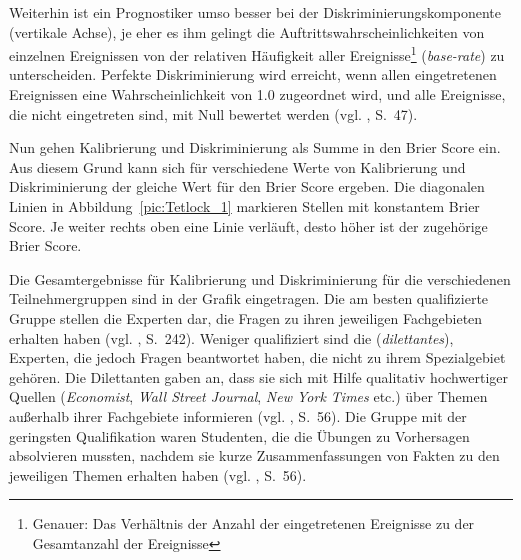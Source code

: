 Weiterhin ist ein Prognostiker umso besser bei der Diskriminierungskomponente
(vertikale Achse),
je eher es ihm gelingt die Auftrittswahrscheinlichkeiten von einzelnen
Ereignissen von der relativen Häufigkeit aller Ereignisse\footnote{
Genauer: Das Verhältnis der Anzahl der eingetretenen Ereignisse zu der
Gesamtanzahl der Ereignisse} (\emph{base-rate})
zu unterscheiden. Perfekte Diskriminierung wird erreicht, wenn allen 
eingetretenen Ereignissen eine Wahrscheinlichkeit von 1.0 zugeordnet wird, und
alle Ereignisse, die nicht eingetreten sind, mit Null bewertet werden
(vgl. \cite{Tetlock}, S.~47).

Nun gehen Kalibrierung und Diskriminierung als Summe in den
Brier Score ein. Aus diesem Grund kann sich für verschiedene
Werte von Kalibrierung und Diskriminierung der gleiche Wert für den
Brier Score ergeben. Die diagonalen Linien in Abbildung~\ref{pic:Tetlock_1}
markieren Stellen mit konstantem Brier Score. Je weiter rechts oben
eine Linie verläuft, desto höher ist der zugehörige Brier Score.

Die Gesamtergebnisse für Kalibrierung und Diskriminierung für die verschiedenen
Teilnehmergruppen sind in der Grafik eingetragen. Die am besten qualifizierte
Gruppe stellen die Experten dar, die Fragen zu ihren jeweiligen Fachgebieten
erhalten haben (vgl. \cite{Tetlock}, S.~242). Weniger qualifiziert sind die 
\grqq (\emph{dilettantes}), Experten, die jedoch Fragen
beantwortet haben, die nicht zu ihrem Spezialgebiet gehören. Die Dilettanten
gaben an, dass sie sich mit Hilfe qualitativ hochwertiger Quellen
(\emph{Economist}, \emph{Wall Street Journal}, \emph{New York Times} etc.) über
Themen außerhalb ihrer Fachgebiete informieren (vgl. \cite{Tetlock}, S.~56).
Die Gruppe mit der geringsten Qualifikation waren Studenten, die die Übungen
zu Vorhersagen absolvieren mussten, nachdem sie kurze Zusammenfassungen von
Fakten zu den jeweiligen Themen erhalten haben (vgl. \cite{Tetlock}, S.~56).

